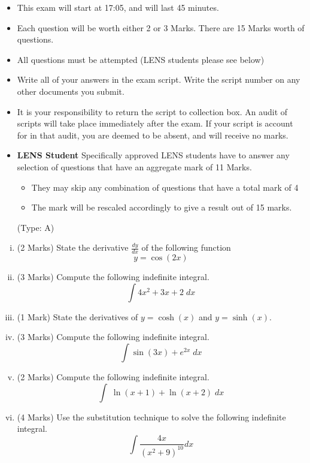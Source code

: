 \documentclass[11pt]{article} %
\begin{document}
	\begin{itemize} 
		\item This exam will start at 17:05, and will last 45 minutes.
		
		\item Each question will be worth either 2 or 3 Marks. There are 15 Marks worth of questions.
		\item All questions must be attempted (LENS students please see below)
		
		\item Write all of your answers in the exam script. Write the script number on any other documents you submit.
		
		\item It is your responsibility to return the script to collection box. An audit of scripts will take place immediately after the exam. If your script is account for in that audit,  you are deemed to be absent, and will receive no marks.
		
		\item \textbf{LENS Student}
		Specifically approved LENS students have to answer any selection of questions that have an aggregate mark of 11 Marks.  
		\begin{itemize}
			\item They may skip any combination of questions that have a total mark of 4
			\item The mark will be rescaled accordingly to give a result out of 15 marks.
		\end{itemize}
		(Type: A)		
		
	\end{itemize}
\newpage
\begin{enumerate}[(i)]
	
	\item (2 Marks) State the derivative $\displaystyle \frac{dy}{dx}$ of the following function
	\[y = \cos(2x)\]
	\item (3 Marks) Compute the following indefinite integral.
	\[ \int 4x^2 + 3x + 2 \; dx \]
	
\newpage	
	\item (1 Mark) State the derivatives of 
	$y = \cosh (x)$ and $y = \sinh(x)$.
\bigskip
	\item (3 Marks) Compute the following indefinite integral.
			\[ \int \sin(3x)  + e^{2x} \; dx \]

\newpage
	\item (2 Marks) Compute the following indefinite integral.
{\Large	\[  \int  \; \ln(x+1) + \ln(x+2) \; dx\]
}
\bigskip

\newpage
	\item (4 Marks) Use the substitution technique to solve the following indefinite integral.
		\[  \int  \frac{4x}{(x^2+9)^{10} } dx\]
\end{enumerate}

\end{document}
